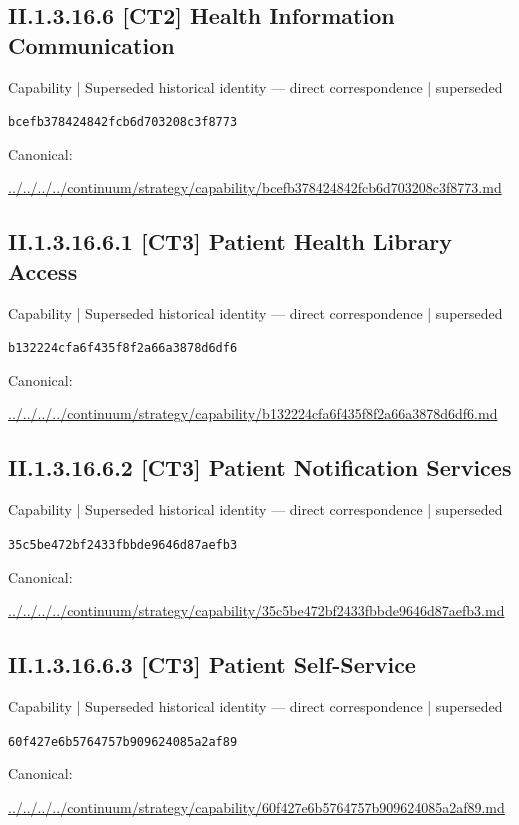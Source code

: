 \documentclass[10pt,a4paper]{article}
\begin{document}
\subsection*{II.1.3.16.6 [CT2] Health Information Communication}
{\small Capability | Superseded historical identity — direct correspondence | superseded}\par
\texttt{bcefb378424842fcb6d703208c3f8773}\par
Canonical: \par
{\footnotesize\url{../../../../continuum/strategy/capability/bcefb378424842fcb6d703208c3f8773.md}}\par
\subsection*{II.1.3.16.6.1 [CT3] Patient Health Library Access}
{\small Capability | Superseded historical identity — direct correspondence | superseded}\par
\texttt{b132224cfa6f435f8f2a66a3878d6df6}\par
Canonical: \par
{\footnotesize\url{../../../../continuum/strategy/capability/b132224cfa6f435f8f2a66a3878d6df6.md}}\par
\subsection*{II.1.3.16.6.2 [CT3] Patient Notification Services}
{\small Capability | Superseded historical identity — direct correspondence | superseded}\par
\texttt{35c5be472bf2433fbbde9646d87aefb3}\par
Canonical: \par
{\footnotesize\url{../../../../continuum/strategy/capability/35c5be472bf2433fbbde9646d87aefb3.md}}\par
\subsection*{II.1.3.16.6.3 [CT3] Patient Self-Service}
{\small Capability | Superseded historical identity — direct correspondence | superseded}\par
\texttt{60f427e6b5764757b909624085a2af89}\par
Canonical: \par
{\footnotesize\url{../../../../continuum/strategy/capability/60f427e6b5764757b909624085a2af89.md}}\par
\end{document}
